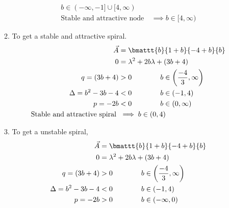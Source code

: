 \begin{enumerate}
\begin{enumerate}
\begin{align}
                        b \in (-\infty,-1] \cup [4, \infty)                                        \\
                        \text{Stable and attractive node}\  & \implies b \in
                        [4, \infty)
                    \end{align}
              \item To get a stable and attractive spiral.
                    \begin{align}
                        \vec{A}                               & = \bmattt{b}{1+b}{-4+b}{b}           \\
                        0                                     & = \lambda^{2} + 2b\lambda + (3b + 4) \\
                        q = (3b+4)                            & > 0 \qquad \qquad
                        b \in \left( \frac{-4}{3}, \infty \right)                                    \\
                        \Delta = b^2 - 3b - 4                 & < 0 \qquad\qquad
                        b \in (-1, 4)                                                                \\
                        p = -2b                               & < 0 \qquad\qquad
                        b \in (0, \infty)                                                            \\
                        \text{Stable and attractive spiral}\  & \implies b \in
                        (0, 4)
                    \end{align}
              \item To get a unstable spiral,
                    \begin{align}
                        \vec{A}                  & = \bmattt{b}{1+b}{-4+b}{b}           \\
                        0                        & = \lambda^{2} + 2b\lambda + (3b + 4) \\
                        q = (3b+4)               & > 0 \qquad \qquad
                        b \in \left( \frac{-4}{3}, \infty \right)                       \\
                        \Delta = b^2 - 3b - 4    & < 0 \qquad\qquad
                        b \in (-1, 4)                                                   \\
                        p = -2b                  & > 0 \qquad\qquad
                        b \in (-\infty, 0)                                              \\

\end{align}
\end{enumerate}
\end{enumerate}
